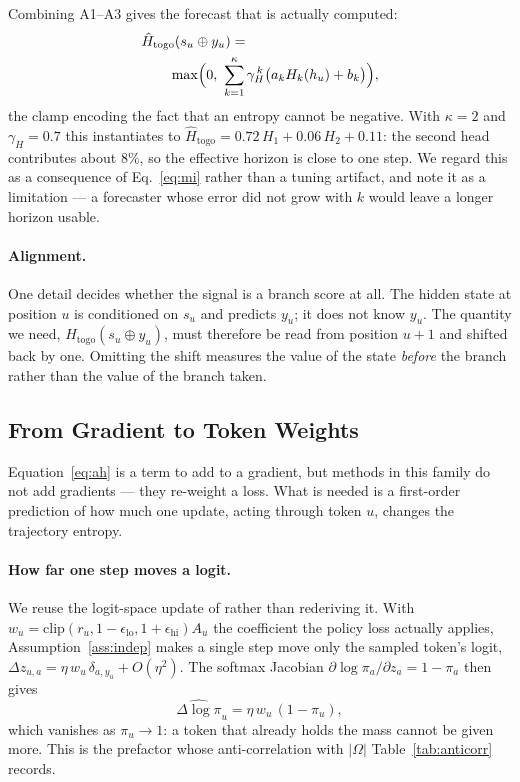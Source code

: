 \documentclass[11pt]{article}
\newcommand{\Htogo}{H_{\mathrm{togo}}}
\newcommand{\Om}{\Omega}
\begin{document}
Combining A1--A3 gives the forecast that is actually computed:
%
\begin{equation}
\begin{split}
&\hat{H}_{\mathrm{togo}}(s_u \oplus y_u) =\\
&\qquad \max\Bigl(0,\ \sum_{k=1}^{\kappa} \gamma_H^{\,k}\bigl(a_k H_k(h_u) + b_k\bigr)\Bigr),
\end{split}
\label{eq:forecast-app}
\end{equation}
%
the clamp encoding the fact that an entropy cannot be negative. With
$\kappa = 2$ and $\gamma_H = 0.7$ this instantiates to
$\hat{H}_{\mathrm{togo}} = 0.72\,H_1 + 0.06\,H_2 + 0.11$: the second head
contributes about $8\%$, so the effective horizon is close to one step. We regard
this as a consequence of Eq.~\eqref{eq:mi} rather than a tuning artifact, and note
it as a limitation --- a forecaster whose error did not grow with $k$ would leave a
longer horizon usable.

\paragraph{Alignment.}
One detail decides whether the signal is a branch score at all. The hidden state at
position $u$ is conditioned on $s_u$ and predicts $y_u$; it does not know $y_u$. The
quantity we need, $\Htogo(s_u \oplus y_u)$, must therefore be read from position
$u+1$ and shifted back by one. Omitting the shift measures the value of the state
\emph{before} the branch rather than the value of the branch taken.

\subsection{From Gradient to Token Weights}
\label{sec:weights}

Equation~\eqref{eq:ah} is a term to add to a gradient, but methods in this family do
not add gradients --- they re-weight a loss. What is needed is a first-order
prediction of how much one update, acting through token $u$, changes the trajectory
entropy.

\paragraph{How far one step moves a logit.}
We reuse the logit-space update of \citet[Eq.~23]{steer} rather than rederiving it.
With $w_u = \mathrm{clip}(r_u, 1-\epsilon_{\mathrm{lo}}, 1+\epsilon_{\mathrm{hi}})A_u$
the coefficient the policy loss actually applies, Assumption~\ref{ass:indep} makes a
single step move only the sampled token's logit,
$\Delta z_{u,a} = \eta\, w_u\, \delta_{a, y_u} + O(\eta^2)$.
The softmax Jacobian $\partial \log \pi_a / \partial z_a = 1 - \pi_a$ then gives
%
\begin{equation}
\widehat{\Delta \log \pi}_u = \eta\, w_u\,(1 - \pi_u),
\label{eq:dlogpi}
\end{equation}
%
which vanishes as $\pi_u \to 1$: a token that already holds the mass cannot be given
more. This is the prefactor whose anti-correlation with $|\Om|$ Table~\ref{tab:anticorr}
records.
\end{document}
